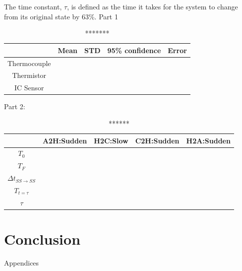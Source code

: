 \documentclass{article}
\begin{document}



The time constant, \(\tau\),  is defined as the time it takes for the system to change from its original state by 63\%.  %
Part 1 %
\begin{table}[H]
    \centering
    \begin{tabular}{c|c|c|c|c}
         &  Mean&  STD&  95\% confidence& Error\\
         \hline
         Thermocouple&  &  &  & \\
         \hline
         Thermistor&  &  &  & \\
         \hline
         IC Sensor&  &  &  & \\
    \end{tabular}
    \caption{*******}
\end{table}
    

Part 2: %

\begin{table}[H]
    \centering
    \begin{tabular}{c|c|c|c|c}
         &  A2H:Sudden &  H2C:Slow &  C2H:Sudden &  H2A:Sudden \\
         \hline
         $T_{0}$ &  &  &  &  \\
         \hline
         $T_{F}$ &  &  &  &  \\
         \hline
         $\Delta t_{SS\rightarrow SS}$ &  &  &  &  \\
         \hline
         $T_{t=\tau}$ &  &  &  &  \\
         \hline
        $\tau$ &  &  &  & \\
    \end{tabular}
    \caption{******}
\end{table}

\section{Conclusion}




\newpage
\thispagestyle{empty}  %
\begin{center}
	\vspace*{\fill}
	{\Huge Appendices}
	\vspace*{\fill}
\end{center}
\end{document}
